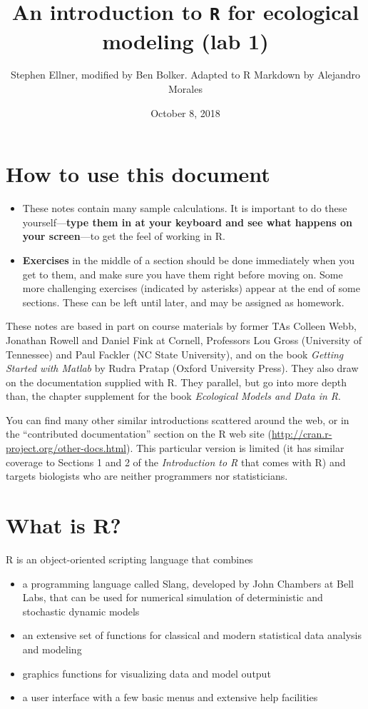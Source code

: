 \documentclass[11pt,]{article}
\title{An introduction to \texttt{R} for ecological modeling (lab 1)}
\author{Stephen Ellner, modified by Ben Bolker. Adapted to R Markdown by
Alejandro Morales}
\date{October 8, 2018}
\begin{document}
\maketitle

\section{How to use this document}\label{how-to-use-this-document}

\begin{itemize}
\item
  These notes contain many sample calculations. It is important to do
  these yourself---\textbf{type them in at your keyboard and see what
  happens on your screen}---to get the feel of working in R.
\item
  \textbf{Exercises} in the middle of a section should be done
  immediately when you get to them, and make sure you have them right
  before moving on. Some more challenging exercises (indicated by
  asterisks) appear at the end of some sections. These can be left until
  later, and may be assigned as homework.
\end{itemize}

These notes are based in part on course materials by former TAs Colleen
Webb, Jonathan Rowell and Daniel Fink at Cornell, Professors Lou Gross
(University of Tennessee) and Paul Fackler (NC State University), and on
the book \emph{Getting Started with Matlab} by Rudra Pratap (Oxford
University Press). They also draw on the documentation supplied with R.
They parallel, but go into more depth than, the chapter supplement for
the book \emph{Ecological Models and Data in R}.

You can find many other similar introductions scattered around the web,
or in the ``contributed documentation'' section on the R web site
(\url{http://cran.r-project.org/other-docs.html}). This particular
version is limited (it has similar coverage to Sections 1 and 2 of the
\emph{Introduction to R} that comes with R) and targets biologists who
are neither programmers nor statisticians.

\section{What is R?}\label{what-is-r}

R is an object-oriented scripting language that combines

\begin{itemize}
\item
  a programming language called Slang, developed by John Chambers at
  Bell Labs, that can be used for numerical simulation of deterministic
  and stochastic dynamic models
\item
  an extensive set of functions for classical and modern statistical
  data analysis and modeling
\item
  graphics functions for visualizing data and model output
\item
  a user interface with a few basic menus and extensive help facilities
\end{itemize}
\end{document}
